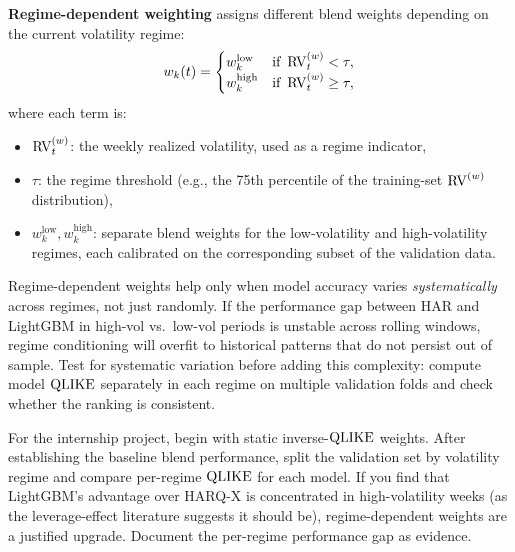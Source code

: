 \textbf{Regime-dependent weighting} assigns different blend weights
depending on the current volatility regime:
\begin{equation}\label{eq:regime-weights}
  w_k(t) =
  \begin{cases}
    w_k^{\text{low}} & \text{if } \operatorname{RV}_t^{(w)} < \tau, \\
    w_k^{\text{high}} & \text{if } \operatorname{RV}_t^{(w)} \geq \tau,
  \end{cases}
\end{equation}
where each term is:
\begin{itemize}
  \item $\operatorname{RV}_t^{(w)}$: the weekly realized volatility, used as a
        regime indicator,
  \item $\tau$: the regime threshold (e.g., the 75th percentile
        of the training-set $\operatorname{RV}^{(w)}$ distribution),
  \item $w_k^{\text{low}}, w_k^{\text{high}}$: separate blend
        weights for the low-volatility and high-volatility regimes,
        each calibrated on the corresponding subset of the validation
        data.
\end{itemize}

\begin{warning}
Regime-dependent weights help only when model accuracy varies
\emph{systematically} across regimes, not just randomly.  If the
performance gap between HAR and LightGBM in high-vol vs.\ low-vol
periods is unstable across rolling windows, regime conditioning will
overfit to historical patterns that do not persist out of sample.
Test for systematic variation before adding this complexity: compute
model $\operatorname{QLIKE}$ separately in each regime on multiple validation folds
and check whether the ranking is consistent.
\end{warning}

\begin{projectconnection}
For the internship project, begin with static inverse-$\operatorname{QLIKE}$
weights.  After establishing the baseline blend performance, split the
validation set by volatility regime and compare per-regime $\operatorname{QLIKE}$ for
each model.  If you find that LightGBM's advantage over HARQ-X is
concentrated in high-volatility weeks (as the leverage-effect
literature suggests it should be), regime-dependent weights are a
justified upgrade.  Document the per-regime performance gap as evidence.
\end{projectconnection}


